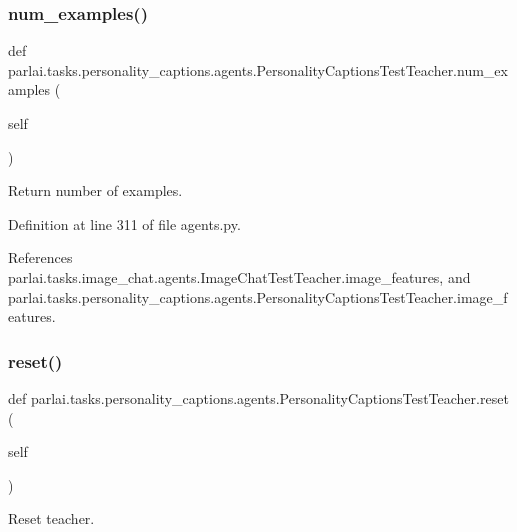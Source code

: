 \subsubsection{\texorpdfstring{num\+\_\+examples()}{num\_examples()}}
{\footnotesize\ttfamily def parlai.\+tasks.\+personality\+\_\+captions.\+agents.\+Personality\+Captions\+Test\+Teacher.\+num\+\_\+examples (\begin{DoxyParamCaption}\item[{}]{self }\end{DoxyParamCaption})}

\begin{DoxyVerb}Return number of examples.\end{DoxyVerb}
 

Definition at line 311 of file agents.\+py.



References parlai.\+tasks.\+image\+\_\+chat.\+agents.\+Image\+Chat\+Test\+Teacher.\+image\+\_\+features, and parlai.\+tasks.\+personality\+\_\+captions.\+agents.\+Personality\+Captions\+Test\+Teacher.\+image\+\_\+features.

\mbox{\label{classparlai_1_1tasks_1_1personality__captions_1_1agents_1_1PersonalityCaptionsTestTeacher_acb0270ac7c4e00d2e9067082599d4c16}} 
\subsubsection{\texorpdfstring{reset()}{reset()}}
{\footnotesize\ttfamily def parlai.\+tasks.\+personality\+\_\+captions.\+agents.\+Personality\+Captions\+Test\+Teacher.\+reset (\begin{DoxyParamCaption}\item[{}]{self }\end{DoxyParamCaption})}

\begin{DoxyVerb}Reset teacher.\end{DoxyVerb}
 

